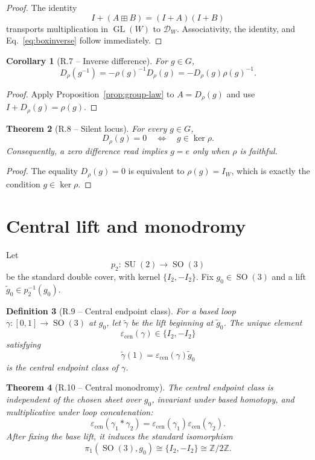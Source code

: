 \documentclass[11pt,letterpaper]{article}
\theoremstyle{returnstyle}
\newtheorem{theorem}{Theorem}[section]
\newtheorem{corollary}[theorem]{Corollary}
\newtheorem{definition}[theorem]{Definition}
\newcommand{\Z}{\mathbb{Z}}
\newcommand{\GL}{\operatorname{GL}}
\newcommand{\SO}{\operatorname{SO}}
\newcommand{\SU}{\operatorname{SU}}
\newcommand{\boxplusop}{\mathbin{\boxplus}}
\begin{document}
\begin{proof}
The identity
\[
I+(A\boxplusop B)=(I+A)(I+B)
\]
transports multiplication in $\GL(W)$ to $\mathcal D_W$.  Associativity, the identity, and Eq.~\eqref{eq:boxinverse} follow immediately.
\end{proof}

\begin{corollary}[R.7 -- Inverse difference]
For $g\in G$,
\[
D_\rho(g^{-1})
=-\rho(g)^{-1}D_\rho(g)
=-D_\rho(g)\rho(g)^{-1}.
\]
\end{corollary}

\begin{proof}
Apply Proposition~\ref{prop:group-law} to $A=D_\rho(g)$ and use $I+D_\rho(g)=\rho(g)$.
\end{proof}

\begin{theorem}[R.8 -- Silent locus]\label{thm:silent}
For every $g\in G$,
\begin{equation}\label{eq:silent}
D_\rho(g)=0
\quad\Longleftrightarrow\quad
g\in\ker\rho.
\end{equation}
Consequently, a zero difference read implies $g=e$ only when $\rho$ is faithful.
\end{theorem}

\begin{proof}
The equality $D_\rho(g)=0$ is equivalent to $\rho(g)=I_W$, which is exactly the condition $g\in\ker\rho$.
\end{proof}

\section{Central lift and monodromy}\label{sec:monodromy}

Let
\[
p_2:\SU(2)\longrightarrow\SO(3)
\]
be the standard double cover, with kernel $\{I_2,-I_2\}$.  Fix $g_0\in\SO(3)$ and a lift $\widetilde g_0\in p_2^{-1}(g_0)$.

\begin{definition}[R.9 -- Central endpoint class]
For a based loop $\gamma:[0,1]\to\SO(3)$ at $g_0$, let $\widetilde\gamma$ be the lift beginning at $\widetilde g_0$.  The unique element
\[
\varepsilon_{\mathrm{cen}}(\gamma)\in\{I_2,-I_2\}
\]
satisfying
\[
\widetilde\gamma(1)=\varepsilon_{\mathrm{cen}}(\gamma)\widetilde g_0
\]
is the central endpoint class of $\gamma$.
\end{definition}

\begin{theorem}[R.10 -- Central monodromy]\label{thm:monodromy}
The central endpoint class is independent of the chosen sheet over $g_0$, invariant under based homotopy, and multiplicative under loop concatenation:
\[
\varepsilon_{\mathrm{cen}}(\gamma_1*\gamma_2)
=
\varepsilon_{\mathrm{cen}}(\gamma_1)
\varepsilon_{\mathrm{cen}}(\gamma_2).
\]
After fixing the base lift, it induces the standard isomorphism
\[
\pi_1(\SO(3),g_0)\cong\{I_2,-I_2\}\cong\Z/2\Z.
\]
\end{theorem}
\end{document}
